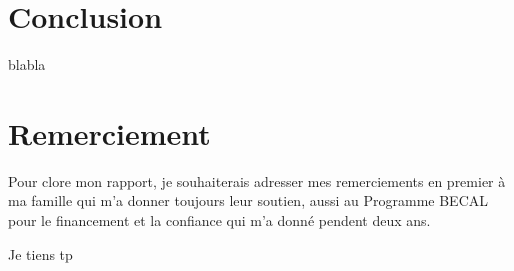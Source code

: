 \section{Conclusion}
blabla

\section{Remerciement}
Pour clore mon rapport, je souhaiterais adresser mes remerciements en premier à ma famille qui m'a donner toujours leur soutien, aussi au Programme BECAL pour le financement et la confiance qui m'a donné pendent deux ans.

Je tiens tp
